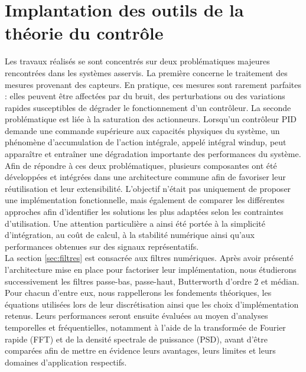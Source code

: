 
\section{Implantation des outils de la théorie du contrôle}
\label{sec:outils_theorie_controle}

Les travaux réalisés se sont concentrés sur deux problématiques majeures rencontrées dans les systèmes asservis. La première concerne le traitement des mesures provenant des capteurs. En pratique, ces mesures sont rarement parfaites : elles peuvent être affectées par du bruit, des perturbations ou des variations rapides susceptibles de dégrader le fonctionnement d'un contrôleur. La seconde problématique est liée à la saturation des actionneurs. Lorsqu'un contrôleur PID demande une commande supérieure aux capacités physiques du système, un phénomène d'accumulation de l'action intégrale, appelé intégral windup, peut apparaître et entraîner une dégradation importante des performances du système. \\

Afin de répondre à ces deux problématiques, plusieurs composantes ont été développées et intégrées dans une architecture commune afin de favoriser leur réutilisation et leur extensibilité. L'objectif n'était pas uniquement de proposer une implémentation fonctionnelle, mais également de comparer les différentes approches afin d'identifier les solutions les plus adaptées selon les contraintes d'utilisation. Une attention particulière a ainsi été portée à la simplicité d'intégration, au coût de calcul, à la stabilité numérique ainsi qu'aux performances obtenues sur des signaux représentatifs. \\

La section \ref{sec:filtres} est consacrée aux filtres numériques. Après avoir présenté l'architecture mise en place pour factoriser leur implémentation, nous étudierons successivement les filtres passe-bas, passe-haut, Butterworth d'ordre 2 et médian. Pour chacun d'entre eux, nous rappellerons les fondements théoriques, les équations utilisées lors de leur discrétisation ainsi que les choix d'implémentation retenus. Leurs performances seront ensuite évaluées au moyen d'analyses temporelles et fréquentielles, notamment à l'aide de la transformée de Fourier rapide (FFT) et de la densité spectrale de puissance (PSD), avant d'être comparées afin de mettre en évidence leurs avantages, leurs limites et leurs domaines d'application respectifs. \\

